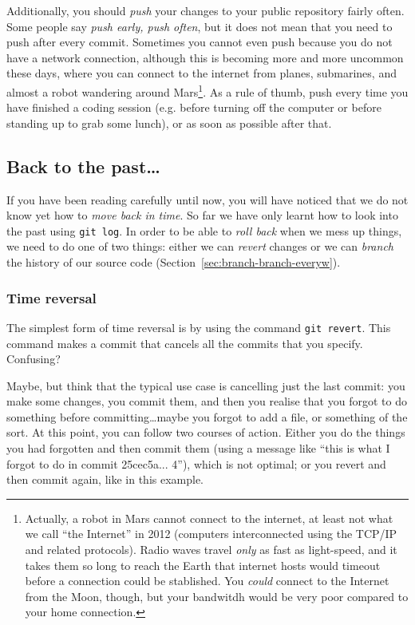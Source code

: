Additionally, you should \emph{push} your changes to your public
repository fairly often. Some people say \emph{push early, push
  often}, but it does not mean that you need to push after every
commit. Sometimes 
you cannot even push because you do not have a network connection,
although this is becoming more and more uncommon these days, where you
can connect to the internet from planes, submarines, and almost a
robot wandering around Mars\footnote{Actually, a robot in Mars cannot
  connect to the internet, at least not what we call ``the Internet'' 
  in 2012 (computers interconnected using the TCP/IP and related protocols). 
  Radio waves travel \emph{only} as fast as light-speed, and it
  takes them so long to reach the Earth that internet hosts would
  timeout before a connection could be stablished. 
  You \emph{could} connect to
  the Internet from the Moon, though, but your bandwitdh would be
  very poor compared to your home connection.}. 
As a rule of thumb, push every time you 
have finished a coding session (e.g. before turning off the computer
or before standing up to grab some lunch), 
or as soon as possible after that.

\subsection{Back to the past\ldots}
\label{sec:branching}

If you have been reading carefully until now, you will have noticed
that we do not know yet how to \emph{move back in time}. So far we
have only learnt how to look into the past using \verb+git log+. In
order to be able to \emph{roll back} when we mess up things, we need
to do one of two things: either we can \emph{revert} changes or we can
\emph{branch} the history of our source code
(Section~\ref{sec:branch-branch-everyw}).

\subsubsection{Time reversal}
\label{sec:time-reversal}

The simplest form of time reversal is by using the command 
\verb+git revert+. This command makes a commit 
that cancels all the commits that
you specify. Confusing? 

Maybe, but think that the typical use case is cancelling just the last
commit: you make some changes, you commit them, and then you realise
that you forgot to do something before committing\ldots maybe you
forgot to add a file, or something of the sort. At this point, you can
follow two courses of action. Either you do the things you had
forgotten and then commit them (using a message like ``this is what I
forgot to do in commit 25cec5a... 4''), which is not optimal; or you
revert and then commit again, like in this example.


